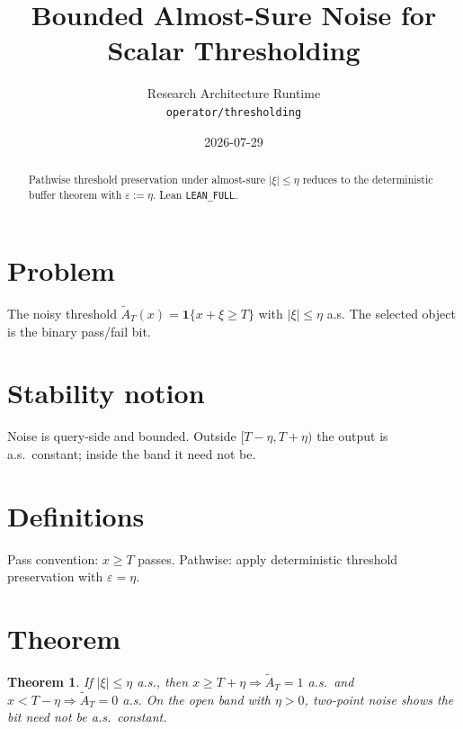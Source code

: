 \documentclass[12pt]{article}
\title{Bounded Almost-Sure Noise for Scalar Thresholding}
\author{Research Architecture Runtime\\[0.25em]
{\normalsize\texttt{operator/thresholding}}}
\date{2026-07-29}
\theoremstyle{plain}
\newtheorem{theorem}{Theorem}
\theoremstyle{definition}
\theoremstyle{remark}
\begin{document}
\maketitle

\begin{abstract}
Pathwise threshold preservation under almost-sure $|\xi|\le\eta$ reduces to the deterministic buffer theorem with $\varepsilon:=\eta$. Lean \texttt{LEAN\_FULL}.
\end{abstract}

\noindent
\begin{center}
\end{center}
\vspace{0.6em}

\section{Problem}
{\raggedright\sloppy
The noisy threshold $\widetilde A_T(x)=\mathbf{1}\{x+\xi\ge T\}$ with $|\xi|\le\eta$ a.s. The selected object is the binary pass/fail bit.
\par}

\section{Stability notion}
Noise is query-side and bounded. Outside $[T-\eta,T+\eta)$ the output is a.s.\ constant; inside the band it need not be.

\section{Definitions}
Pass convention: $x\ge T$ passes. Pathwise: apply deterministic threshold preservation with $\varepsilon=\eta$.

\section{Theorem}
\begin{theorem}\label{thm:inv}
If $|\xi|\le\eta$ a.s., then $x\ge T+\eta\Rightarrow\widetilde A_T=1$ a.s.\ and $x<T-\eta\Rightarrow\widetilde A_T=0$ a.s. On the open band with $\eta>0$, two-point noise shows the bit need not be a.s.\ constant.
\end{theorem}
\end{document}
